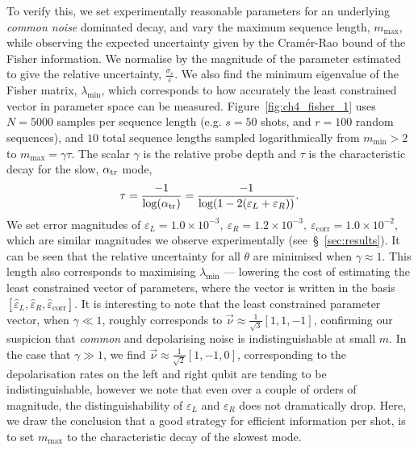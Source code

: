 To verify this, we set experimentally reasonable parameters for an underlying \emph{common noise} dominated decay, and vary the maximum sequence length, $m_\mathrm{max}$, while observing the expected uncertainty given by the Cram\'er-Rao bound of the Fisher information. We normalise by the magnitude of the parameter estimated to give the relative uncertainty, $\frac{\sigma_\varepsilon}{\varepsilon}$. We also find the minimum eigenvalue of the Fisher matrix, $\lambda_\mathrm{min}$, which corresponds to how accurately the least constrained vector in parameter space can be measured. Figure~\ref{fig:ch4_fisher_1} uses $N=5000$ samples per sequence length (e.g. $s=50$ shots, and $r=100$ random sequences), and $10$ total sequence lengths sampled logarithmically from $m_\mathrm{min}>2$ to $m_\mathrm{max}=\gamma\tau$. The scalar $\gamma$ is the relative probe depth and $\tau$ is the characteristic decay for the slow, $\alpha_{\rm tr}$ mode,
\begin{equation}
    \tau = \frac{-1}{\log(\alpha_{\rm tr})} = \frac{-1}{\log(1-2(\varepsilon_L+\varepsilon_R))}.
\end{equation}
We set error magnitudes of $\varepsilon_L = 1.0\times10^{-3},~\varepsilon_R = 1.2\times10^{-3},~\varepsilon_\mathrm{corr}=1.0\times10^{-2}$, which are similar magnitudes we observe experimentally (see~\S~\ref{sec:results}). It can be seen that the relative uncertainty for all $\theta$ are minimised when $\gamma\approx 1$. This length also corresponds to maximising $\lambda_\mathrm{min}$ --- lowering the cost of estimating the least constrained vector of parameters, where the vector is written in the basis $[\hat\varepsilon_L,\hat\varepsilon_R,\hat\varepsilon_\mathrm{corr}]$. It is interesting to note that the least constrained parameter vector, when $\gamma\ll 1$, roughly corresponds to $\vec\nu\approx\frac{1}{\sqrt{3}}[1,1,-1]$, confirming our suspicion that \emph{common} and depolarising noise is indistinguishable at small $m$. In the case that $\gamma\gg 1$, we find $\vec\nu\approx\frac{1}{\sqrt{2}}[1,-1,0]$, corresponding to the depolarisation rates on the left and right qubit are tending to be indistinguishable, however we note that even over a couple of orders of magnitude, the distinguishability of $\varepsilon_L$ and $\varepsilon_R$ does not dramatically drop. Here, we draw the conclusion that a good strategy for efficient information per shot, is to set $m_\mathrm{max}$ to the characteristic decay of the slowest mode.\\

